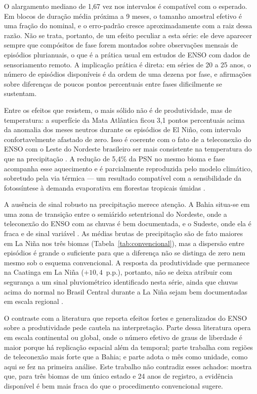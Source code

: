 \documentclass[a4paper,fleqn]{cas-sc}
\begin{document}
O alargamento mediano de 1,67 vez nos intervalos é compatível com o esperado. Em blocos de duração média próxima a 9 meses, o tamanho amostral efetivo é uma fração do nominal, e o erro-padrão cresce aproximadamente com a raiz dessa razão. Não se trata, portanto, de um efeito peculiar a esta série: ele deve aparecer sempre que compósitos de fase forem montados sobre observações mensais de episódios plurianuais, o que é a prática usual em estudos de ENSO com dados de sensoriamento remoto. A implicação prática é direta: em séries de 20 a 25 anos, o número de episódios disponíveis é da ordem de uma dezena por fase, e afirmações sobre diferenças de poucos pontos percentuais entre fases dificilmente se sustentam.

Entre os efeitos que resistem, o mais sólido não é de produtividade, mas de temperatura: a superfície da Mata Atlântica ficou 3,1 pontos percentuais acima da anomalia dos meses neutros durante os episódios de El Niño, com intervalo confortavelmente afastado de zero. Isso é coerente com o fato de a teleconexão do ENSO com o Leste do Nordeste brasileiro ser mais consistente na temperatura do que na precipitação \citep{ropelewski1987, kayano2007}. A redução de 5,4\% da PSN no mesmo bioma e fase acompanha esse aquecimento e é parcialmente reproduzida pelo modelo climático, sobretudo pela via térmica --- um resultado compatível com a sensibilidade da fotossíntese à demanda evaporativa em florestas tropicais úmidas \citep{lawson2019, vourlitis2022}.

A ausência de sinal robusto na precipitação merece atenção. A Bahia situa-se em uma zona de transição entre o semiárido setentrional do Nordeste, onde a teleconexão do ENSO com as chuvas é bem documentada, e o Sudeste, onde ela é fraca e de sinal variável \citep{grimm2003, grimm2009}. As médias brutas de precipitação são de fato maiores em La Niña nos três biomas (Tabela~\ref{tab:convencional}), mas a dispersão entre episódios é grande o suficiente para que a diferença não se distinga de zero nem mesmo sob o esquema convencional. A resposta da produtividade que permanece na Caatinga em La Niña ($+10{,}4$~p.p.), portanto, não se deixa atribuir com segurança a um sinal pluviométrico identificado nesta série, ainda que chuvas acima do normal no Brasil Central durante a La Niña sejam bem documentadas em escala regional \citep{cai2020}.

O contraste com a literatura que reporta efeitos fortes e generalizados do ENSO sobre a produtividade \citep{zhao2010, nemani2003} pede cautela na interpretação. Parte dessa literatura opera em escala continental ou global, onde o número efetivo de graus de liberdade é maior porque há replicação espacial além da temporal; parte trabalha com regiões de teleconexão mais forte que a Bahia; e parte adota o mês como unidade, como aqui se fez na primeira análise. Este trabalho não contradiz esses achados: mostra que, para três biomas de um único estado e 24 anos de registro, a evidência disponível é bem mais fraca do que o procedimento convencional sugere.
\end{document}
